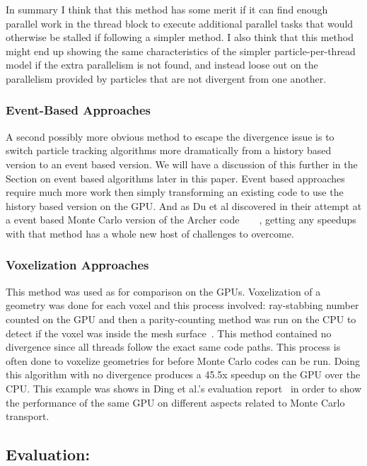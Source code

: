 In summary I think that this method has some merit if it can find enough parallel work in the thread block to execute additional parallel tasks that would otherwise be stalled if following a simpler method.
%
I also think that this method might end up showing the same characteristics of the simpler particle-per-thread model if the extra parallelism is not found, and instead loose out on the parallelism provided by particles that are not divergent from one another. 

\subsubsection*{\textbf{Event-Based Approaches}}

A second possibly more obvious method to escape the divergence issue is to switch particle tracking algorithms more dramatically from a history based version to an event based version.
%
We will have a discussion of this further in the Section on event based algorithms later in this paper.
%
Event based approaches require much more work then simply transforming an existing code to use the history based version on the GPU.
%
And as Du et al discovered in their attempt at a event based Monte Carlo version of the Archer code~\cite{xu2015archer}~\cite{du2013evaluation}~\cite{liu2015comparison}~\cite{su2013monte},  getting any speedups with that method has a whole new host of challenges to overcome.

\subsubsection*{\textbf{Voxelization Approaches}}

This method was used as for comparison on the GPUs.
%
Voxelization of a geometry was done for each voxel and this process involved: ray-stabbing number counted on the GPU and then a parity-counting method was run on the CPU to detect if the voxel was inside the mesh surface~\cite{na2010deformable}.
%
This method contained no divergence since all threads follow the exact same code paths.
%
This process is often done to voxelize geometries for before Monte Carlo codes can be run.
%
Doing this algorithm with no divergence produces a 45.5x speedup on the GPU over the CPU.
%
This example was shows in Ding et al.'s evaluation report~\cite{ding2011evaluation} in order to show the performance of the same GPU on different aspects related to Monte Carlo transport.

\subsection*{ \textbf{Evaluation:}}

